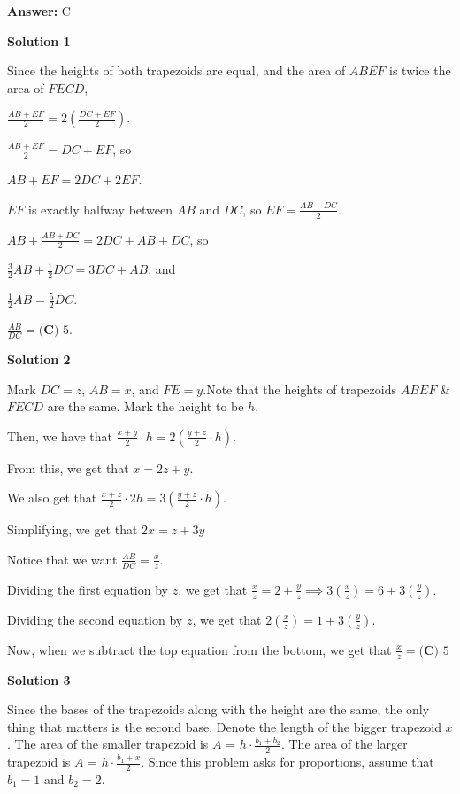 \begin{enumerate}
 \textbf{Answer: }C



\textbf{Solution 1}

Since the heights of both trapezoids are equal, and the area of $ABEF$ is twice the area of $FECD$, 

 $\frac{AB+EF}{2}=2\left(\frac{DC+EF}{2}\right)$.

 $\frac{AB+EF}{2}=DC+EF$, so

 $AB+EF=2DC+2EF$.

 $EF$ is exactly halfway between $AB$ and $DC$, so $EF=\frac{AB+DC}{2}$. 

 $AB+\frac{AB+DC}{2}=2DC+AB+DC$, so

 $\frac{3}{2}AB+\frac{1}{2}DC=3DC+AB$, and 

 $\frac{1}{2}AB=\frac{5}{2}DC$.

 $\frac{AB}{DC} = \boxed{\textbf{(C) }5}$.

 



\textbf{Solution 2}

Mark $DC=z$, $AB=x$, and $FE=y.$Note that the heights of trapezoids $ABEF$ & $FECD$ are the same. Mark the height to be $h$.

 Then, we have that $\frac{x+y}{2}\cdot h=2(\frac{y+z}{2} \cdot h)$.

 From this, we get that $x=2z+y$.

 We also get that $\frac{x+z}{2} \cdot 2h= 3(\frac{y+z}{2} \cdot h)$.

 Simplifying, we get that $2x=z+3y$

 Notice that we want $\frac{AB}{DC}=\frac{x}{z}$.

 Dividing the first equation by $z$, we get that $\frac{x}{z}=2+\frac{y}{z}\implies 3(\frac{x}{z})=6+3(\frac{y}{z})$.

 Dividing the second equation by $z$, we get that $2(\frac{x}{z})=1+3(\frac{y}{z})$.

 Now, when we subtract the top equation from the bottom, we get that $\frac{x}{z}=\boxed{\textbf{(C) }5}$




\textbf{Solution 3}

Since the bases of the trapezoids along with the height are the same, the only thing that matters is the second base. Denote the length of the bigger trapezoid $x$. The area of the smaller trapezoid is $A$ = $h \cdot \frac {b_1 + b_2}{2}$. The area of the larger trapezoid is $A$ = $h \cdot \frac {b_1 + x}{2}$. Since this problem asks for proportions, assume that $b_1 = 1$ and $b_2 = 2$. 


\end{enumerate}
